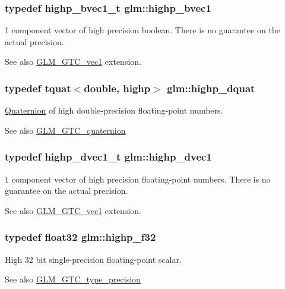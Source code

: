 \subsubsection[{highp\+\_\+bvec1}]{\setlength{\rightskip}{0pt plus 5cm}typedef highp\+\_\+bvec1\+\_\+t {\bf glm\+::highp\+\_\+bvec1}}\label{namespaceglm_ad24a2ac97dbfbece48f504224bb20b59}
1 component vector of high precision boolean. There is no guarantee on the actual precision. \begin{DoxySeeAlso}{See also}
\hyperlink{group__gtc__vec1}{G\+L\+M\+\_\+\+G\+T\+C\+\_\+vec1} extension. 
\end{DoxySeeAlso}
\hypertarget{namespaceglm_a8bcc5a1042194d46762e0d00fd627670}{}
\subsubsection[{highp\+\_\+dquat}]{\setlength{\rightskip}{0pt plus 5cm}typedef {\bf tquat}$<$double, highp$>$ {\bf glm\+::highp\+\_\+dquat}}\label{namespaceglm_a8bcc5a1042194d46762e0d00fd627670}
\hyperlink{class_quaternion}{Quaternion} of high double-\/precision floating-\/point numbers.

\begin{DoxySeeAlso}{See also}
\hyperlink{group__gtc__quaternion}{G\+L\+M\+\_\+\+G\+T\+C\+\_\+quaternion} 
\end{DoxySeeAlso}
\hypertarget{namespaceglm_a5c7219ea9af2efb28506cabc8633a4d7}{}
\subsubsection[{highp\+\_\+dvec1}]{\setlength{\rightskip}{0pt plus 5cm}typedef highp\+\_\+dvec1\+\_\+t {\bf glm\+::highp\+\_\+dvec1}}\label{namespaceglm_a5c7219ea9af2efb28506cabc8633a4d7}
1 component vector of high precision floating-\/point numbers. There is no guarantee on the actual precision. \begin{DoxySeeAlso}{See also}
\hyperlink{group__gtc__vec1}{G\+L\+M\+\_\+\+G\+T\+C\+\_\+vec1} extension. 
\end{DoxySeeAlso}
\hypertarget{namespaceglm_a48d80b6fd3a40b71b2e414493832d1ca}{}
\subsubsection[{highp\+\_\+f32}]{\setlength{\rightskip}{0pt plus 5cm}typedef {\bf float32} {\bf glm\+::highp\+\_\+f32}}\label{namespaceglm_a48d80b6fd3a40b71b2e414493832d1ca}
High 32 bit single-\/precision floating-\/point scalar. \begin{DoxySeeAlso}{See also}
\hyperlink{group__gtc__type__precision}{G\+L\+M\+\_\+\+G\+T\+C\+\_\+type\+\_\+precision} 
\end{DoxySeeAlso}
\hypertarget{namespaceglm_aed934f561aaf8ad891c0a8f5e719aea8}{}
